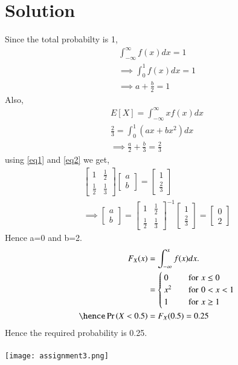 \documentclass[journal,12pt,twocolumn]{IEEEtran}
\begin{document}
\section{Solution}
Since the total probabilty is 1,\\
\begin{align}
\int_{-\infty}^{\infty}f(x)dx=1 \\
\implies \int_{0}^{1}f(x)dx=1 \\
\implies a+\frac{b}{2}=1 \label{eq1}
 \end{align}
 Also,
 \begin{align}
     E[X]=\int_{-\infty}^{\infty}xf(x)dx\\
     \frac{2}{3}=\int_{0}^{1}(ax+bx^{2})dx\\
     \implies \frac{a}{2}+\frac{b}{3}=\frac{2}{3}\label{eq2}
\end{align}
using \eqref{eq1} and \eqref{eq2} we get,\\
\begin{align}
\begin{bmatrix}
1 & \frac{1}{2}\\
\frac{1}{2} & \frac{1}{3}
\end{bmatrix}
\begin{bmatrix}
a\\
b
\end{bmatrix}
=\begin{bmatrix}
1\\
\frac{2}{3}
\end{bmatrix}\\
\implies 
\begin{bmatrix}
a\\
b
\end{bmatrix}
=\begin{bmatrix}
1 & \frac{1}{2}\\
\frac{1}{2} & \frac{1}{3}
\end{bmatrix}^{-1}
\begin{bmatrix}
1\\
\frac{2}{3}
\end{bmatrix}
=\begin{bmatrix}
0\\
2
\end{bmatrix}
\end{align}
Hence a=0 and b=2.
\begin{align}
F_{X}(x)&=\int_{-\infty}^{x}f(x)dx.\\
        &=\begin{cases}
        0 \quad &\text{for}\,\, x\leq0\\
        x^{2} \quad &\text{for}\,\, 0<x<1\\
        1 \quad &\text{for} \,\, x\geq1
               \end{cases}\\
\hence \pr{X<0.5}&=F_{X}(0.5)=0.25
\end{align}
Hence the required probability is 0.25.\\\\
\texttt{[image: assignment3.png]}
\end{document}
